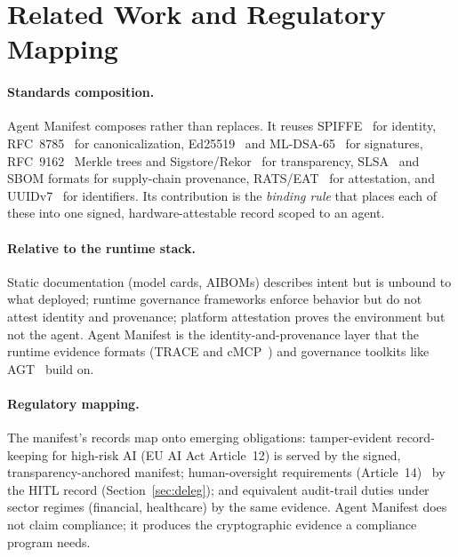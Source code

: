 \section{Related Work and Regulatory Mapping}
\label{sec:related}

\paragraph{Standards composition.}
Agent Manifest composes rather than replaces. It reuses SPIFFE~\citep{spiffe2018} for
identity, RFC~8785~\citep{jcs8785} for canonicalization, Ed25519~\citep{eddsa8032} and
ML-DSA-65~\citep{mldsa204} for signatures, RFC~9162~\citep{ct9162} Merkle trees and
Sigstore/Rekor~\citep{sigstore2021} for transparency, SLSA~\citep{slsa2023} and
SBOM formats for supply-chain provenance, RATS/EAT~\citep{rats2021,eat2023} for
attestation, and UUIDv7~\citep{uuid9562} for identifiers. Its contribution is the
\emph{binding rule} that places each of these into one signed, hardware-attestable
record scoped to an agent.

\paragraph{Relative to the runtime stack.}
Static documentation (model cards, AIBOMs) describes intent but is unbound to what
deployed; runtime governance frameworks enforce behavior but do not attest identity
and provenance; platform attestation proves the environment but not the agent. Agent
Manifest is the identity-and-provenance layer that the runtime evidence formats
(TRACE and cMCP~\citep{trace2026,cmcp2026}) and governance toolkits like
AGT~\citep{agt2026} build on.

\paragraph{Regulatory mapping.}
The manifest's records map onto emerging obligations: tamper-evident record-keeping
for high-risk AI (EU AI Act Article~12) is served by the signed, transparency-anchored
manifest; human-oversight requirements (Article~14)~\citep{euaiact2024} by the HITL
record (Section~\ref{sec:deleg}); and equivalent audit-trail duties under sector
regimes (financial, healthcare) by the same evidence. Agent Manifest does not claim
compliance; it produces the cryptographic evidence a compliance program needs.
